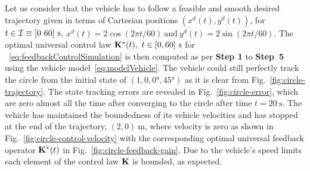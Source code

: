 \documentclass[
12pt,draftcls,onecolumn%
]{IEEEtran}
\begin{document}
Let us consider that the vehicle has to follow a feasible and smooth desired trajectory given in terms of Cartesian positions $(x^d(t), y^d(t))$, for $t\in {\cal I}\equiv [0~60]~\si{\second}$.  $x^d(t) = 2\cos(2\pi t/60)~\text{and}~y^d(t) = 2\sin(2\pi t/60)$. The optimal universal control law ${\bf K}^*(t),~t\in[0,60]~\si{\second}$ for ~\eqref{eq:feedbackControlSimulation} is then computed as per {\bf Step 1} to {\bf Step~5} using the vehicle model~\eqref{eq:modelVehicle}. The vehicle could still perfectly track the circle from the initial state of $(1,0,0\si{\degree},45\si{\degree})$ as it is clear from Fig.~\ref{fig:circle-trajectory}. The state tracking errors are revealed in Fig.~\ref{fig:circle-error}, which are zero almost all the time after converging to the circle after time $t=\SI{20}{\second}.$ The vehicle has maintained the boundedness of its vehicle velocities and has stopped at the end of the trajectory, $(2,0)~\si{\meter}$, where velocity is zero as shown in Fig.~\ref{fig:circle-control-velocity} with the corresponding optimal universal feedback operator ${\bf K}^*(t)$ in Fig.~\ref{fig:circle-feedback-gain}. Due to the vehicle's speed limits each element of the control law ${\bf K}$ is bounded, as expected.  
\end{document}
